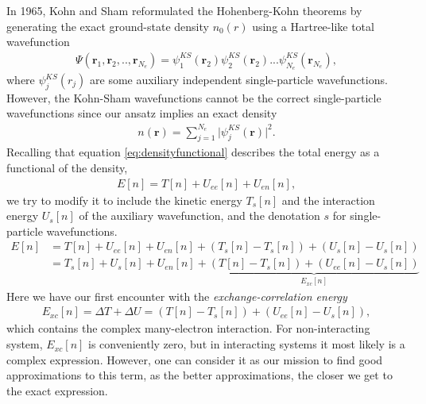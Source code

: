 In 1965, Kohn and Sham \cite{Kohn1965} reformulated the Hohenberg-Kohn theorems by generating the exact ground-state density $n_0(r)$ using a Hartree-like total wavefunction
\begin{align}
    \Psi(\textbf{r}_1,\textbf{r}_2,..,\textbf{r}_{N_e}) = \psi_1^{KS}(\textbf{r}_2)\psi_2^{KS}(\textbf{r}_2)...\psi_{N_e}^{KS}(\textbf{r}_{N_e}),
\end{align}
where $\psi_j^{KS}(r_j)$ are some auxiliary independent single-particle wavefunctions. However, the Kohn-Sham wavefunctions cannot be the correct single-particle wavefunctions since our ansatz implies an exact density
\begin{align}
  n(\textbf{r}) = \sum_{j=1}^{N_e}\lvert \psi_j^{KS}(\textbf{r})\rvert^2.
\end{align}
Recalling that equation \ref{eq:densityfunctional} describes the total energy as a functional of the density,
\begin{align}
  E[n] = T[n] + U_{ee}[n] + U_{en}[n],
\end{align}
we try to modify it to include the kinetic energy $T_s[n]$ and the interaction energy $U_s[n]$ of the auxiliary wavefunction, and the denotation $s$ for single-particle wavefunctions.
\begin{align*}
  E[n] &= T[n] + U_{ee}[n] + U_{en}[n] + \left( T_s[n] - T_s[n] \right) + \left( U_s[n] - U_s[n] \right) \\
  &= T_s[n] + U_{s}[n] + U_{en}[n] + \underbrace{\left(T[n] - T_s[n] \right) + \left( U_{ee}[n] - U_s[n] \right)}_{E_{xc}[n]}
\end{align*}
Here we have our first encounter with the \textit{exchange-correlation energy}
\begin{align}
  E_{xc}[n] = \Delta T + \Delta U = \left(T[n] - T_s[n] \right) + \left( U_{ee}[n] - U_s[n] \right),
\end{align}
which contains the complex many-electron interaction. For non-interacting system, $E_{xc}[n]$ is conveniently zero, but in interacting systems it most likely is a complex expression. However, one can consider it as our mission to find good approximations to this term, as the better approximations, the closer we get to the exact expression.

